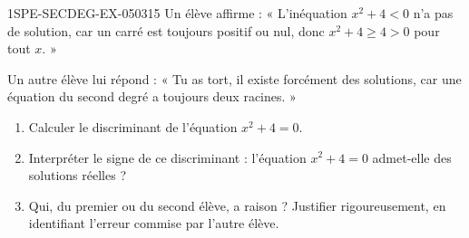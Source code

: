 \begin{exercice}{1SPE-SECDEG-EX-050}{3}{15}
Un élève affirme : « L'inéquation $x^2 + 4 < 0$ n'a pas de solution, car un carré est toujours positif ou nul, donc $x^2 + 4 \geqslant 4 > 0$ pour tout $x$. »

Un autre élève lui répond : « Tu as tort, il existe forcément des solutions, car une équation du second degré a toujours deux racines. »

\begin{enumerate}
  \item Calculer le discriminant de l'équation $x^2 + 4 = 0$.
  \item Interpréter le signe de ce discriminant : l'équation $x^2 + 4 = 0$ admet-elle des solutions réelles ?
  \item Qui, du premier ou du second élève, a raison ? Justifier rigoureusement, en identifiant l'erreur commise par l'autre élève.
\end{enumerate}
\end{exercice}
